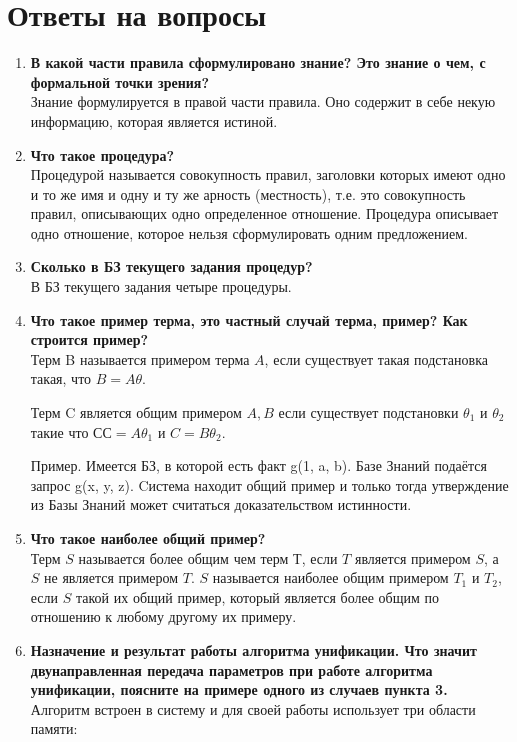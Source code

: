\newpage
\section*{Ответы на вопросы}
\begin{enumerate}
    \item \textbf{В какой части правила сформулировано знание? Это знание о чем, с формальной точки зрения?}\\
    Знание формулируется в правой части правила. Оно содержит в себе некую информацию, которая является истиной.
    
    \item \textbf{Что такое процедура?}\\
    Процедурой называется совокупность правил, заголовки которых имеют одно и то же имя и одну и ту же арность (местность), т.е. это совокупность правил, описывающих одно определенное отношение. Процедура описывает одно отношение, которое нельзя сформулировать одним предложением.
    
    \item \textbf{Сколько в БЗ  текущего задания процедур?}\\
    В БЗ текущего задания четыре процедуры.

    \item \textbf{Что такое пример терма, это частный случай терма, пример? Как строится пример?}\\
    Терм B называется примером терма $A$, если существует такая подстановка такая, что $B = A  \theta$.
    
    Терм C является общим примером $A, B$ если существует подстановки $\theta_1$ и $\theta_2$ такие что С$ С = A \theta_1$ и $C = B \theta_2$.
	
	Пример. Имеется БЗ, в которой есть факт g(1, a, b). Базе Знаний подаётся запрос g(x, y, z). Cистема находит общий пример и только тогда утверждение из Базы Знаний может считаться доказательством истинности.
	
	
    \item \textbf{Что такое наиболее общий пример?}\\
   	Терм $S$ называется более общим чем терм $Т$, если $T$ является примером $S$, а $S$ не является примером $T$. 
   	$S$ называется наиболее общим примером $T_1$ и $T_2$, если $S$ такой их общий пример, который является более общим по отношению к любому другому их примеру. 
    
    \item \textbf{Назначение и результат работы алгоритма унификации. Что значит двунаправленная передача параметров при работе алгоритма унификации, поясните на примере одного из случаев пункта  3.}\\
    Алгоритм встроен в систему и для своей работы использует три области памяти:
    \begin{itemize}
    	

\end{itemize}
\end{enumerate}
